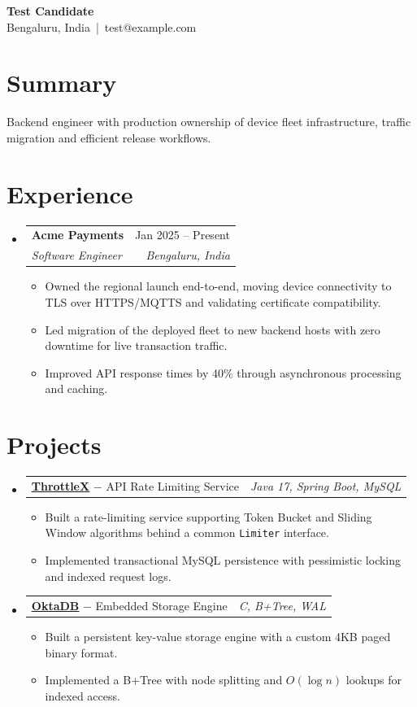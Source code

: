 \documentclass[letterpaper,10pt]{article}
\makeatletter
\newcommand{\resumeItem}[1]{
    \item\small{#1 \vspace{-2pt}}
}
\newcommand{\resumeSubheading}[4]{
    \vspace{-2pt}\item
    \begin{tabular*}{0.97\textwidth}[t]{l@{\extracolsep{\fill}}r}
        \textbf{#1} & #2 \\
        \textit{\small #3} & \textit{\small #4} \\
    \end{tabular*}\vspace{-7pt}
}
\newcommand{\resumeProjectHeading}[2]{
    \item
    \begin{tabular*}{0.97\textwidth}{l@{\extracolsep{\fill}}r}
        \small #1 & #2 \\
    \end{tabular*}\vspace{-7pt}
}
\newcommand{\resumeItemListStart}{\begin{itemize}[leftmargin=0.18in]}
\newcommand{\resumeItemListEnd}{\end{itemize}\vspace{-6pt}}
\makeatother
\begin{document}
\begin{center}
    {\fontsize{17}{19}\selectfont\textbf{Test Candidate}}\\[-1pt]
    \small Bengaluru, India \,|\, test@example.com
\end{center}

\section{Summary}
\small
Backend engineer with production ownership of device fleet infrastructure, traffic migration and efficient release workflows.

\section{Experience}
\begin{itemize}[label={},leftmargin=0pt]
  \resumeSubheading
    {Acme Payments}{Jan 2025 -- Present}
    {Software Engineer}{Bengaluru, India}
  \begin{itemize}
    \resumeItem{Owned the regional launch end-to-end, moving device connectivity to TLS over HTTPS/MQTTS and validating certificate compatibility.}
    \resumeItem{Led migration of the deployed fleet to new backend hosts with zero downtime for live transaction traffic.}
    \resumeItem{Improved API response times by 40\% through asynchronous processing and caching.}
  \end{itemize}
\end{itemize}

\section{Projects}
\begin{itemize}[leftmargin=0.15in, label={}]
  \resumeProjectHeading
    {\textbf{\href{https://example.com/ThrottleX}{\underline{ThrottleX}}} $-$ API Rate Limiting Service}
    {\textit{Java 17, Spring Boot, MySQL}}
  \resumeItemListStart
    \resumeItem{Built a rate-limiting service supporting Token Bucket and Sliding Window algorithms behind a common \texttt{Limiter} interface.}
    \resumeItem{Implemented transactional MySQL persistence with pessimistic locking and indexed request logs.}
  \resumeItemListEnd

  \resumeProjectHeading
    {\textbf{\href{https://example.com/OktaDB}{\underline{OktaDB}}} $-$ Embedded Storage Engine}
    {\textit{C, B+Tree, WAL}}
  \resumeItemListStart
    \resumeItem{Built a persistent key-value storage engine with a custom 4KB paged binary format.}
    \resumeItem{Implemented a B+Tree with node splitting and $O(\log n)$ lookups for indexed access.}
  \resumeItemListEnd
\end{itemize}
\end{document}
